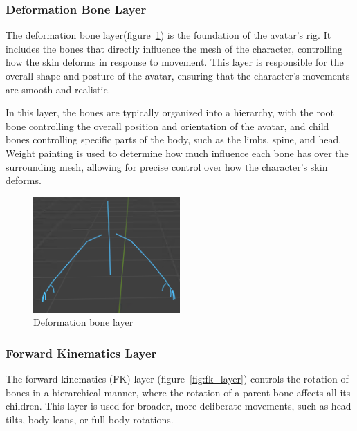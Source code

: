 \documentclass[../../main.tex]{subfiles}
\begin{document}
\subsubsection{Deformation Bone Layer}
\label{ch:avatar_creation_pose_synthesis:proc_rig_signing_avatars:bone_layers:deform_bone_layer}

The deformation bone layer(figure~\ref{fig:deform_layer}) is the foundation of the avatar's rig. It includes the bones that directly influence the mesh of the character, controlling how the skin deforms in response to movement. This layer is responsible for the overall shape and posture of the avatar, ensuring that the character's movements are smooth and realistic.

In this layer, the bones are typically organized into a hierarchy, with the root bone controlling the overall position and orientation of the avatar, and child bones controlling specific parts of the body, such as the limbs, spine, and head. Weight painting is used to determine how much influence each bone has over the surrounding mesh, allowing for precise control over how the character's skin deforms.

\begin{figure}
    \centering
    \includegraphics[width=0.5\textwidth]{chapters/avatar_creation_pose_synthesis/images/deform_layer.png}
    \caption{Deformation bone layer}
    \label{fig:deform_layer}
\end{figure}

\subsubsection{Forward Kinematics Layer}
\label{ch:avatar_creation_pose_synthesis:proc_rig_signing_avatars:bone_layers:fk_layer}

The forward kinematics (FK) layer (figure~\ref{fig:fk_layer}) controls the rotation of bones in a hierarchical manner, where the rotation of a parent bone affects all its children. This layer is used for broader, more deliberate movements, such as head tilts, body leans, or full-body rotations.
\end{document}
